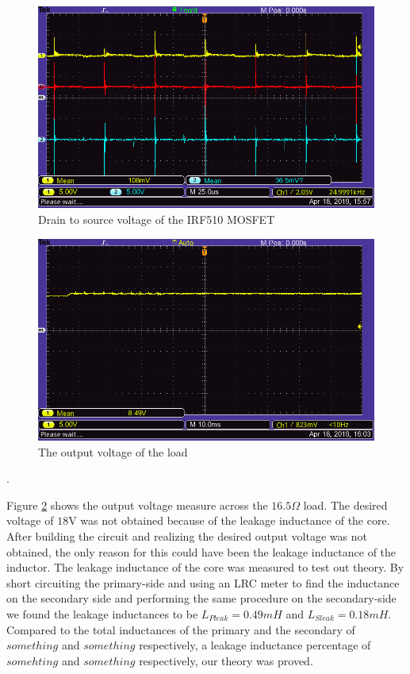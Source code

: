 \documentclass[a4paper, 12pt]{article}
\begin{document}
\begin{figure}[H]
  \centering
  \includegraphics[width=\textwidth]{images/VDS.png}
  \caption{Drain to source voltage of the IRF510 MOSFET}
  \label{fig:vds}
\end{figure} 

\begin{figure}[H]
  \centering
  \includegraphics[width=\textwidth]{images/output_from_load.png}
  \caption{The output voltage of the load}
  \label{fig:output_from_load}
\end{figure}.

Figure \ref{fig:output_from_load} shows the output voltage measure across the
$16.5\Omega$ load. The desired voltage of $18$V was not obtained because of the
leakage inductance of the core. After building the circuit and realizing the
desired output voltage was not obtained, the only reason for this could have
been the leakage inductance of the inductor. The leakage inductance of the core
was measured to test out theory. By short circuiting the primary-side and using
an LRC meter to find the inductance on the secondary side and performing the
same procedure on the secondary-side we found the leakage inductances to be
$L_{Pleak} = 0.49mH$ and $L_{Sleak} = 0.18mH$. Compared to the total
inductances of the primary and the secondary of $something$ and $something$
respectively, a leakage inductance percentage of $somehting$ and $something$
respectively, our theory was proved.\\
\end{document}
